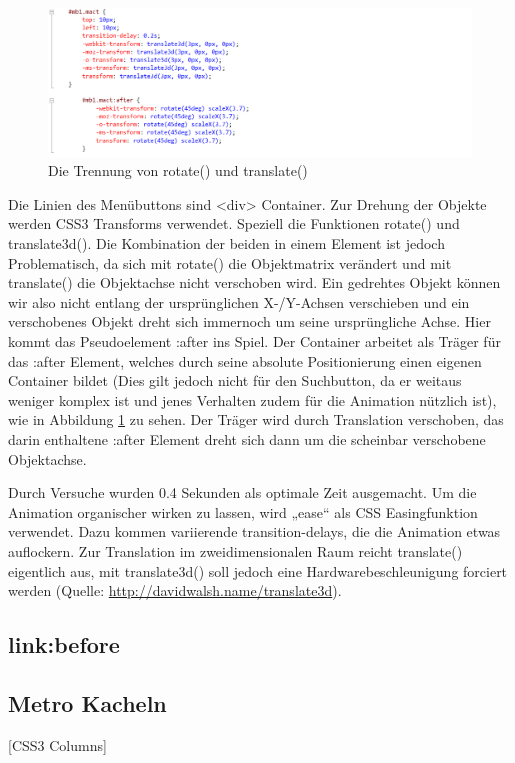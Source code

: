 \begin{figure} [h]
\includegraphics[width=\textwidth]{./img/css_after.png}
\caption{Die Trennung von rotate() und translate()}
\label{css_after}
\end{figure}
Die Linien des Menübuttons sind <div> Container. Zur Drehung der Objekte werden CSS3 Transforms verwendet. Speziell die Funktionen rotate() und translate3d(). Die Kombination der beiden in einem Element ist jedoch Problematisch, da sich mit rotate() die Objektmatrix verändert und mit translate() die Objektachse nicht verschoben wird. Ein gedrehtes Objekt können wir also nicht entlang der ursprünglichen X-/Y-Achsen verschieben und ein verschobenes Objekt dreht sich immernoch um seine ursprüngliche Achse. Hier kommt das Pseudoelement :after ins Spiel. Der Container arbeitet als Träger für das :after Element, welches durch seine absolute Positionierung einen eigenen Container bildet (Dies gilt jedoch nicht für den Suchbutton, da er weitaus weniger komplex ist und jenes Verhalten zudem für die Animation nützlich ist), wie in Abbildung \ref{css_after} zu sehen. Der Träger wird durch Translation verschoben, das darin enthaltene :after Element dreht sich dann um die scheinbar verschobene Objektachse.


Durch Versuche wurden 0.4 Sekunden als optimale Zeit ausgemacht. Um die Animation organischer wirken zu lassen, wird „ease“ als CSS Easingfunktion verwendet. Dazu kommen variierende transition-delays, die die Animation etwas auflockern.
Zur Translation im zweidimensionalen Raum reicht translate() eigentlich aus, mit translate3d() soll jedoch eine Hardwarebeschleunigung forciert werden (Quelle: \url{http://davidwalsh.name/translate3d}).

\subsection{link:before}

\subsection{Metro Kacheln}
[CSS3 Columns]
